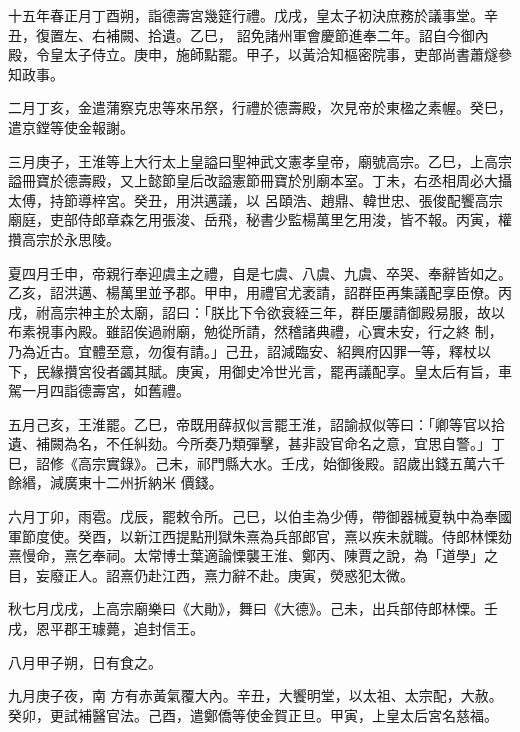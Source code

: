 \begin{pinyinscope}
 十五年春正月丁酉朔，詣德壽宮幾筵行禮。戊戌，皇太子初決庶務於議事堂。辛丑，復置左、右補闕、拾遺。乙巳，
 詔免諸州軍會慶節進奉二年。詔自今御內殿，令皇太子侍立。庚申，施師點罷。甲子，以黃洽知樞密院事，吏部尚書蕭燧參知政事。



 二月丁亥，金遣蒲察克忠等來吊祭，行禮於德壽殿，次見帝於東楹之素幄。癸巳，遣京鏜等使金報謝。



 三月庚子，王淮等上大行太上皇謚曰聖神武文憲孝皇帝，廟號高宗。乙巳，上高宗謚冊寶於德壽殿，又上懿節皇后改謚憲節冊寶於別廟本室。丁未，右丞相周必大攝太傅，持節導梓宮。癸丑，用洪邁議，以
 呂頤浩、趙鼎、韓世忠、張俊配饗高宗廟庭，吏部侍郎章森乞用張浚、岳飛，秘書少監楊萬里乞用浚，皆不報。丙寅，權攢高宗於永思陵。



 夏四月壬申，帝親行奉迎虞主之禮，自是七虞、八虞、九虞、卒哭、奉辭皆如之。乙亥，詔洪邁、楊萬里並予郡。甲申，用禮官尤袤請，詔群臣再集議配享臣僚。丙戌，祔高宗神主於太廟，詔曰：「朕比下令欲衰絰三年，群臣屢請御殿易服，故以布素視事內殿。雖詔俟過祔廟，勉從所請，然稽諸典禮，心實未安，行之終
 制，乃為近古。宜體至意，勿復有請。」己丑，詔減臨安、紹興府囚罪一等，釋杖以下，民緣攢宮役者蠲其賦。庚寅，用御史冷世光言，罷再議配享。皇太后有旨，車駕一月四詣德壽宮，如舊禮。



 五月己亥，王淮罷。乙巳，帝既用薛叔似言罷王淮，詔諭叔似等曰：「卿等官以拾遺、補闕為名，不任糾劾。今所奏乃類彈擊，甚非設官命名之意，宜思自警。」丁巳，詔修《高宗實錄》。己未，祁門縣大水。壬戌，始御後殿。詔歲出錢五萬六千餘緡，減廣東十二州折納米
 價錢。



 六月丁卯，雨雹。戊辰，罷敕令所。己巳，以伯圭為少傅，帶御器械夏執中為奉國軍節度使。癸酉，以新江西提點刑獄朱熹為兵部郎官，熹以疾未就職。侍郎林慄劾熹慢命，熹乞奉祠。太常博士葉適論慄襲王淮、鄭丙、陳賈之說，為「道學」之目，妄廢正人。詔熹仍赴江西，熹力辭不赴。庚寅，熒惑犯太微。



 秋七月戊戌，上高宗廟樂曰《大勛》，舞曰《大德》。己未，出兵部侍郎林慄。壬戌，恩平郡王璩薨，追封信王。



 八月甲子朔，日有食之。



 九月庚子夜，南
 方有赤黃氣覆大內。辛丑，大饗明堂，以太祖、太宗配，大赦。癸卯，更試補醫官法。己酉，遣鄭僑等使金賀正旦。甲寅，上皇太后宮名慈福。




\end{pinyinscope}

